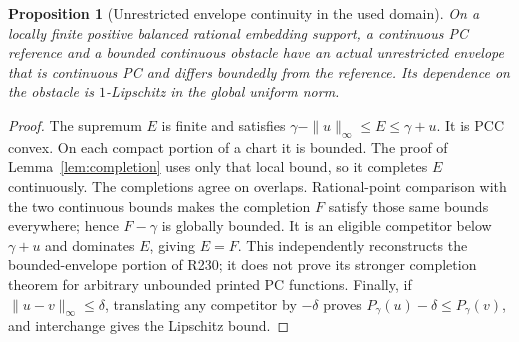 \documentclass[11pt]{article}
\newtheorem{proposition}[theorem]{Proposition}
\theoremstyle{definition}\newtheorem{definition}[theorem]{Definition}
\theoremstyle{remark}\newtheorem{remark}[theorem]{Remark}
\begin{document}
\begin{proposition}[Unrestricted envelope continuity in the used domain]\label{prop:envelope}
On a locally finite positive balanced rational embedding support, a continuous PC reference and a bounded continuous obstacle have an actual unrestricted envelope that is continuous PC and differs boundedly from the reference. Its dependence on the obstacle is $1$-Lipschitz in the global uniform norm.
\end{proposition}
\begin{proof}
The supremum $E$ is finite and satisfies $\gamma-\|u\|_\infty\leq E\leq\gamma+u$. It is PCC convex. On each compact portion of a chart it is bounded. The proof of Lemma~\ref{lem:completion} uses only that local bound, so it completes $E$ continuously. The completions agree on overlaps. Rational-point comparison with the two continuous bounds makes the completion $F$ satisfy those same bounds everywhere; hence $F-\gamma$ is globally bounded. It is an eligible competitor below $\gamma+u$ and dominates $E$, giving $E=F$. This independently reconstructs the bounded-envelope portion of R230; it does not prove its stronger completion theorem for arbitrary unbounded printed PC functions. Finally, if $\|u-v\|_\infty\leq\delta$, translating any competitor by $-\delta$ proves $P_\gamma(u)-\delta\leq P_\gamma(v)$, and interchange gives the Lipschitz bound.
\end{proof}
\end{document}

